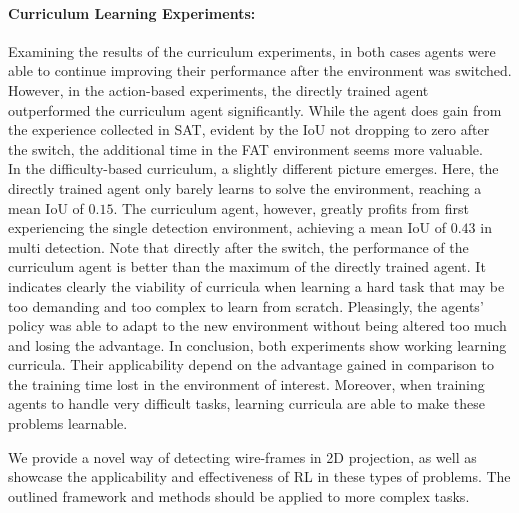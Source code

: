 \documentclass[11pt]{article} %
\begin{document}
\paragraph{Curriculum Learning Experiments:}
Examining the results of the curriculum experiments, in both cases agents were able to continue improving their performance after the environment was switched.
However, in the action-based experiments, the directly trained agent outperformed the curriculum agent significantly. 
While the agent does gain from the experience collected in SAT, evident by the IoU not dropping to zero after the switch, the additional time in the FAT environment seems more valuable.\\
In the difficulty-based curriculum, a slightly different picture emerges.
Here, the directly trained agent only barely learns to solve the environment, reaching a mean IoU of $0.15$.
The curriculum agent, however, greatly profits from first experiencing the single detection environment, achieving a mean IoU of $0.43$ in multi detection.
Note that directly after the switch, the performance of the curriculum agent is better than the maximum of the directly trained agent.
It indicates clearly the viability of curricula when learning a hard task that may be too demanding and too complex to learn from scratch.
Pleasingly, the agents' policy was able to adapt to the new environment without being altered too much and losing the advantage.
In conclusion, both experiments show working learning curricula.
Their applicability depend on the advantage gained in comparison to the training time lost in the environment of interest.
Moreover, when training agents to handle very difficult tasks, learning curricula are able to make these problems learnable.

We provide a novel way of detecting wire-frames in 2D projection, as well as showcase the applicability and effectiveness of RL in these types of problems.
The outlined framework and methods should be applied to more complex tasks.
\begin{multicols}{2}
{\tiny

}
\end{multicols}
\end{document}
